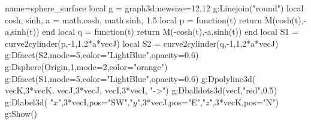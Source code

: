 \documentclass[12pt]{standalone}
\begin{document}
\begin{luadraw}{name=sphere_surface}
local g = graph3d:new{size={12,12}}
g:Linejoin("round")
local cosh, sinh, a = math.cosh, math.sinh, 1.5
local p = function(t) return M(cosh(t),-a,sinh(t)) end
local q = function(t) return M(-cosh(t),-a,sinh(t)) end
local S1 = curve2cylinder(p,-1,1,2*a*vecJ)
local S2 = curve2cylinder(q,-1,1,2*a*vecJ)
g:Dfacet(S2,{mode=5,color="LightBlue",opacity=0.6})
g:Dsphere(Origin,1,{mode=2,color="orange"})
g:Dfacet(S1,{mode=5,color="LightBlue",opacity=0.6})
g:Dpolyline3d( {{vecK,3*vecK}, {vecJ,3*vecJ}, {vecI,3*vecI}}, "->")
g:Dballdots3d(vecI,"red",0.5)
g:Dlabel3d( "$x$",3*vecI,{pos="SW"},"$y$",3*vecJ,{pos="E"},"$z$",3*vecK,{pos="N"})
g:Show()
\end{luadraw}
\end{document}
